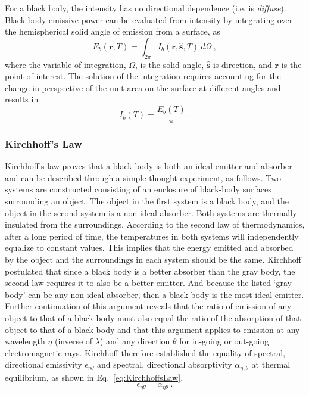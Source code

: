 For a black body, the intensity has no directional dependence (i.e. is \textit{diffuse}). Black body emissive power can be evaluated from intensity by integrating over the hemispherical solid angle of emission from a surface, as 
\begin{equation}
    E_b(\textbf{r},T) = \int_{2\pi}{I_b(\textbf{r},\hat{\textbf{s}},T)}~d\Omega{}\ ,
    \label{eq:EmissivePowerFromIntensity}
\end{equation}
where the variable of integration, $\Omega{}$, is the solid angle, $\hat{\textbf{s}}$ is direction, and $\textbf{r}$ is the point of interest. The solution of the integration requires accounting for the change in perspective of the unit area on the surface at different angles and results in
\begin{equation}
    I_b(T) = \frac{E_b(T)}{\pi}\ .
    \label{eq:Intensity}
\end{equation}

\subsubsection{Kirchhoff's Law} \label{sec:KirchoffsLaw}
Kirchhoff's law proves that a black body is both an ideal emitter and absorber and can be described through a simple thought experiment, as follows. Two systems are constructed consisting of an enclosure of black-body surfaces surrounding an object. The object in the first system is a black body, and the object in the second system is a non-ideal absorber. Both systems are thermally insulated from the surroundings. 
According to the second law of thermodynamics, after a long period of time, the temperatures in both systems will independently equalize to constant values. This implies that the energy emitted and absorbed by the object and the surroundings in each system should be the same.
Kirchhoff postulated that since a black body is a better absorber than the gray body, the second law requires it to also be a better emitter. And because the listed `gray body' can be any non-ideal absorber, then a black body is the most ideal emitter.
Further continuation of this argument reveals that the ratio of emission of any object to that of a black body must also equal the ratio of the absorption of that object to that of a black body and that this argument applies to emission at any wavelength $\eta$ (inverse of $\lambda$) and any direction $\theta$ for in-going or out-going electromagnetic rays. Kirchhoff therefore established the equality of spectral, directional emissivity $\epsilon_{\eta{}\theta{}}$ and spectral, directional absorptivity $\alpha{}_{\eta,\theta}$ at thermal equilibrium, as shown in Eq.~\ref{eq:KirchhoffsLaw},
\begin{equation}
    \epsilon{}_{\eta{}\theta{}}=\alpha{}_{\eta{}\theta{}}\ .
    \label{eq:KirchhoffsLaw}
\end{equation}


